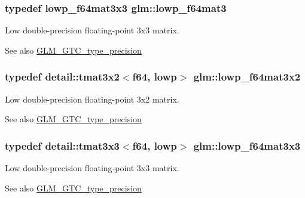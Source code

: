 \subsubsection[{\texorpdfstring{lowp\+\_\+f64mat3}{lowp_f64mat3}}]{\setlength{\rightskip}{0pt plus 5cm}typedef lowp\+\_\+f64mat3x3 {\bf glm\+::lowp\+\_\+f64mat3}}\hypertarget{group__gtc__type__precision_ga4acbda53fb7ff9568c0a2786fad450b8}{}\label{group__gtc__type__precision_ga4acbda53fb7ff9568c0a2786fad450b8}
Low double-\/precision floating-\/point 3x3 matrix. \begin{DoxySeeAlso}{See also}
\hyperlink{group__gtc__type__precision}{G\+L\+M\+\_\+\+G\+T\+C\+\_\+type\+\_\+precision} 
\end{DoxySeeAlso}
\subsubsection[{\texorpdfstring{lowp\+\_\+f64mat3x2}{lowp_f64mat3x2}}]{\setlength{\rightskip}{0pt plus 5cm}typedef detail\+::tmat3x2$<$f64, lowp$>$ {\bf glm\+::lowp\+\_\+f64mat3x2}}\hypertarget{group__gtc__type__precision_ga99f6455a37a4c407a26981561184c76d}{}\label{group__gtc__type__precision_ga99f6455a37a4c407a26981561184c76d}
Low double-\/precision floating-\/point 3x2 matrix. \begin{DoxySeeAlso}{See also}
\hyperlink{group__gtc__type__precision}{G\+L\+M\+\_\+\+G\+T\+C\+\_\+type\+\_\+precision} 
\end{DoxySeeAlso}
\subsubsection[{\texorpdfstring{lowp\+\_\+f64mat3x3}{lowp_f64mat3x3}}]{\setlength{\rightskip}{0pt plus 5cm}typedef detail\+::tmat3x3$<$f64, lowp$>$ {\bf glm\+::lowp\+\_\+f64mat3x3}}\hypertarget{group__gtc__type__precision_ga3b636bef3048da2f7935eae13e66f7b3}{}\label{group__gtc__type__precision_ga3b636bef3048da2f7935eae13e66f7b3}
Low double-\/precision floating-\/point 3x3 matrix. \begin{DoxySeeAlso}{See also}
\hyperlink{group__gtc__type__precision}{G\+L\+M\+\_\+\+G\+T\+C\+\_\+type\+\_\+precision} 
\end{DoxySeeAlso}
